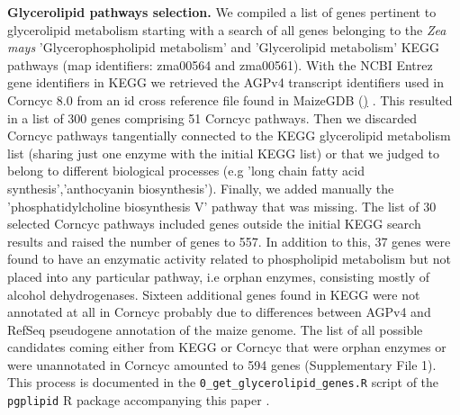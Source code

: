 \documentclass[9pt,twocolumn,twoside,lineno]{BioRxiv}
\begin{document}
\textbf{Glycerolipid pathways selection.}
We compiled a list of genes pertinent to glycerolipid metabolism starting with a search of all genes belonging to the \textit{Zea mays} 'Glycerophospholipid metabolism' and 'Glycerolipid metabolism' KEGG pathways \cite{kanehisa2019} (map identifiers: zma00564 and zma00561). 
With the NCBI Entrez gene identifiers in KEGG we retrieved the AGPv4 transcript identifiers used in Corncyc 8.0 \cite{portwood2019, walsh2016} from an id cross reference file found in MaizeGDB (\href{https://www.maizegdb.org/search/gene/download_gene_xrefs.php?relative=v4}) \cite{portwood2019}.
This resulted in a list of 300 genes comprising 51 Corncyc pathways. 
Then we discarded Corncyc pathways  tangentially connected to the KEGG glycerolipid metabolism list (sharing just one enzyme with the initial KEGG list) or that we judged to belong to different biological processes (e.g 'long chain fatty acid synthesis','anthocyanin biosynthesis'). 
Finally, we added manually the 'phosphatidylcholine biosynthesis V' pathway that was missing. 
The list of 30 selected Corncyc pathways included genes outside the initial KEGG search results and raised the number of genes to 557. 
In addition to this, 37 genes were found to have an enzymatic activity related to phospholipid metabolism but not placed into any particular pathway, i.e orphan enzymes, consisting mostly of alcohol dehydrogenases. 
Sixteen additional genes found in KEGG were not annotated at all in Corncyc probably due to differences between AGPv4 and RefSeq pseudogene annotation of the maize genome. 
The list of all possible candidates coming either from KEGG or Corncyc that were orphan enzymes or were unannotated in Corncyc amounted to 594 genes (Supplementary File 1). 
This process is documented in the \verb|0_get_glycerolipid_genes.R| script of the \verb|pgplipid| R package accompanying this paper \cite{fausto_rodriguez_zapata_2020_4323410}.
\end{document}
